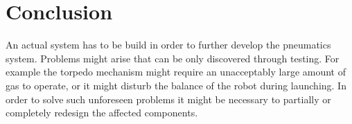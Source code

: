 \section{Conclusion}\label{sec:conclusion}
An actual system has to be build in order to further develop the pneumatics system. Problems might arise that can be only discovered through testing. For example the torpedo mechanism might require an unacceptably large amount of gas to operate, or it might disturb the balance of the robot during launching. In order to solve such unforeseen problems it might be necessary to partially or completely redesign the affected components.